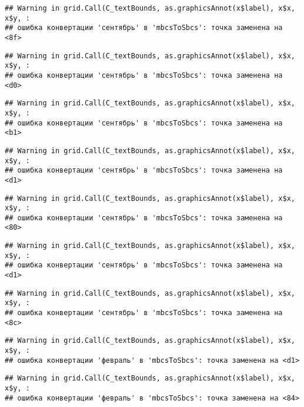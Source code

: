 \documentclass[
]{article}
\begin{document}
\begin{verbatim}
## Warning in grid.Call(C_textBounds, as.graphicsAnnot(x$label), x$x, x$y, :
## ошибка конвертации 'сентябрь' в 'mbcsToSbcs': точка заменена на <8f>
\end{verbatim}

\begin{verbatim}
## Warning in grid.Call(C_textBounds, as.graphicsAnnot(x$label), x$x, x$y, :
## ошибка конвертации 'сентябрь' в 'mbcsToSbcs': точка заменена на <d0>
\end{verbatim}

\begin{verbatim}
## Warning in grid.Call(C_textBounds, as.graphicsAnnot(x$label), x$x, x$y, :
## ошибка конвертации 'сентябрь' в 'mbcsToSbcs': точка заменена на <b1>
\end{verbatim}

\begin{verbatim}
## Warning in grid.Call(C_textBounds, as.graphicsAnnot(x$label), x$x, x$y, :
## ошибка конвертации 'сентябрь' в 'mbcsToSbcs': точка заменена на <d1>
\end{verbatim}

\begin{verbatim}
## Warning in grid.Call(C_textBounds, as.graphicsAnnot(x$label), x$x, x$y, :
## ошибка конвертации 'сентябрь' в 'mbcsToSbcs': точка заменена на <80>
\end{verbatim}

\begin{verbatim}
## Warning in grid.Call(C_textBounds, as.graphicsAnnot(x$label), x$x, x$y, :
## ошибка конвертации 'сентябрь' в 'mbcsToSbcs': точка заменена на <d1>
\end{verbatim}

\begin{verbatim}
## Warning in grid.Call(C_textBounds, as.graphicsAnnot(x$label), x$x, x$y, :
## ошибка конвертации 'сентябрь' в 'mbcsToSbcs': точка заменена на <8c>
\end{verbatim}

\begin{verbatim}
## Warning in grid.Call(C_textBounds, as.graphicsAnnot(x$label), x$x, x$y, :
## ошибка конвертации 'февраль' в 'mbcsToSbcs': точка заменена на <d1>
\end{verbatim}

\begin{verbatim}
## Warning in grid.Call(C_textBounds, as.graphicsAnnot(x$label), x$x, x$y, :
## ошибка конвертации 'февраль' в 'mbcsToSbcs': точка заменена на <84>
\end{verbatim}
\end{document}
